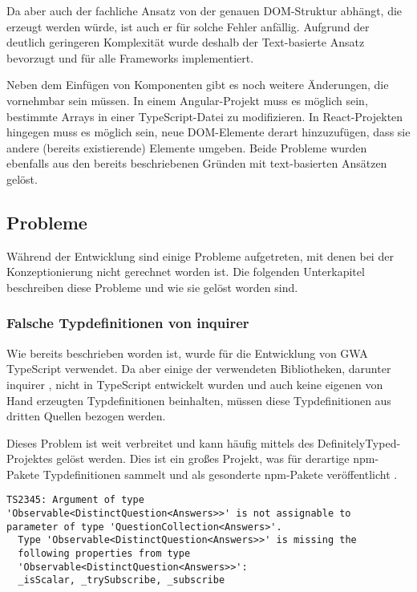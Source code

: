 Da aber auch der fachliche Ansatz von der genauen \gls{DOM}-Struktur abhängt, die erzeugt werden würde, ist auch er für solche Fehler anfällig. Aufgrund der deutlich geringeren Komplexität wurde deshalb der Text-basierte Ansatz bevorzugt und für alle Frameworks implementiert.

Neben dem Einfügen von Komponenten gibt es noch weitere Änderungen, die vornehmbar sein müssen. In einem Angular-Projekt muss es möglich sein, bestimmte Arrays in einer TypeScript-Datei zu modifizieren. In React-Projekten hingegen muss es möglich sein, neue \gls{DOM}-Elemente derart hinzuzufügen, dass sie andere (bereits existierende) Elemente umgeben. Beide Probleme wurden ebenfalls aus den bereits beschriebenen Gründen mit text-basierten Ansätzen gelöst.

\subsection{Probleme}
Während der Entwicklung sind einige Probleme aufgetreten, mit denen bei der Konzeptionierung nicht gerechnet worden ist. Die folgenden Unterkapitel beschreiben diese Probleme und wie sie gelöst worden sind.

\subsubsection{Falsche Typdefinitionen von inquirer}
\label{inquirer_type_issue}

Wie bereits beschrieben worden ist, wurde für die Entwicklung von \gls{GWA} TypeScript verwendet. Da aber einige der verwendeten Bibliotheken, darunter inquirer \cite{inquirer_package_json}, nicht in TypeScript entwickelt wurden und auch keine eigenen von Hand erzeugten Typdefinitionen beinhalten, müssen diese Typdefinitionen aus dritten Quellen bezogen werden.

Dieses Problem ist weit verbreitet und kann häufig mittels des DefinitelyTyped-Projektes gelöst werden. Dies ist ein großes Projekt, was für derartige \gls{npm}-Pakete Typdefinitionen sammelt und als gesonderte \gls{npm}-Pakete veröffentlicht \cite{DT_github}.

\begin{lstlisting}[caption={TypeScript-Fehlermeldung bei der Verwendung von inquirer mit einem RxJS-Observable}, captionpos=b, label={code:inquirer_ts_error}]
TS2345: Argument of type
'Observable<DistinctQuestion<Answers>>' is not assignable to
parameter of type 'QuestionCollection<Answers>'.
  Type 'Observable<DistinctQuestion<Answers>>' is missing the
  following properties from type
  'Observable<DistinctQuestion<Answers>>':
  _isScalar, _trySubscribe, _subscribe
\end{lstlisting}

